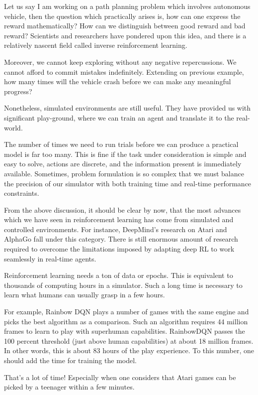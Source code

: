 \documentclass[conference]{IEEEtran}
\begin{document}
Let us say I am working on a path planning problem which involves autonomous vehicle, then the question which practically arises is, how can one express the reward mathematically? How can we distinguish between good reward and bad reward? Scientists and researchers have pondered upon this idea, and there is a relatively nascent field called inverse reinforcement learning.

Moreover, we cannot keep exploring without any negative repercussions. We cannot afford to commit mistakes indefinitely. Extending on previous example, how many times will the vehicle crash before we can make any meaningful progress?

Nonetheless, simulated environments are still useful. They have provided us with significant play-ground, where we can train an agent and translate it to the real-world.

The number of times we need to run trials before we can produce a practical model is far too many. This is fine if the task under consideration is simple and easy to solve, actions are discrete, and the information present is immediately available. Sometimes, problem formulation is so complex that we must balance the precision of our simulator with both training time and real-time performance constraints.

From the above discussion, it should be clear by now, that the most advances which we have seen in reinforcement learning has come from simulated and controlled environments. For instance, DeepMind's research on Atari and AlphaGo fall under this category. There is still enormous amount of research required to overcome the limitations imposed by adapting deep RL to work seamlessly in real-time agents.

Reinforcement learning needs a ton of data or epochs. This is equivalent to thousands of computing hours in a simulator. Such a long time is necessary to learn what humans can usually grasp in a few hours.

For example, Rainbow DQN plays a number of games with the same engine and picks the best algorithm as a comparison. Such an algorithm requires 44 million frames to learn to play with superhuman capabilities. RainbowDQN passes the 100 percent threshold (just above human capabilities) at about 18 million frames. In other words, this is about 83 hours of the play experience. To this number, one should add the time for training the model.

That’s a lot of time! Especially when one considers that Atari games can be picked by a teenager within a few minutes.
\end{document}
